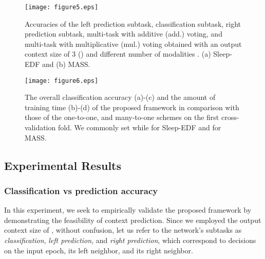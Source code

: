 \documentclass[10pt,twocolumn,twoside]{IEEEtran}
\begin{document}
\begin{figure*} [!t]
		\centering
		\texttt{[image: figure5.eps]}
		\caption{Accuracies of the left prediction subtask, classification subtask, right prediction subtask, multi-task with additive (add.) voting, and multi-task with multiplicative (mul.) voting obtained with an output context size of 3 () and different number of modalities . (a) Sleep-EDF and (b) MASS.}
		\label{fig:predictionvsclassification}
\end{figure*}
\begin{figure} [!t]
		\centering
		\texttt{[image: figure6.eps]}
		\caption{The overall classification accuracy (a)-(c) and the amount of training time (b)-(d) of the proposed framework in comparison with those of the one-to-one, and many-to-one schemes on the first cross-validation fold. We commonly set  while  for Sleep-EDF and   for MASS.}
		\label{fig:inputcontext_vs_outputcontext}
\end{figure}

\subsection{Experimental Results}

\subsubsection{Classification vs prediction accuracy}

In this experiment, we seek to empirically validate the proposed framework by demonstrating the feasibility of context prediction. Since we employed the output context size of , without confusion, let us refer to the network's subtasks as \emph{classification}, \emph{left prediction}, and \emph{right prediction}, which correspond to decisions on the input epoch, its left neighbor, and its right neighbor.
\end{document}
